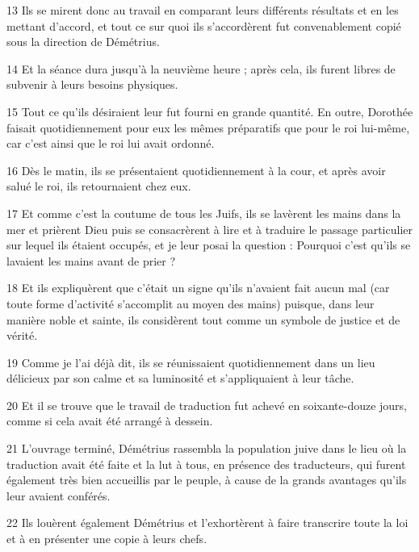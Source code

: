 \par 13 Ils se mirent donc au travail en comparant leurs différents résultats et en les mettant d'accord, et tout ce sur quoi ils s'accordèrent fut convenablement copié sous la direction de Démétrius.

\par 14 Et la séance dura jusqu'à la neuvième heure ; après cela, ils furent libres de subvenir à leurs besoins physiques.

\par 15 Tout ce qu'ils désiraient leur fut fourni en grande quantité. En outre, Dorothée faisait quotidiennement pour eux les mêmes préparatifs que pour le roi lui-même, car c'est ainsi que le roi lui avait ordonné.

\par 16 Dès le matin, ils se présentaient quotidiennement à la cour, et après avoir salué le roi, ils retournaient chez eux.

\par 17 Et comme c'est la coutume de tous les Juifs, ils se lavèrent les mains dans la mer et prièrent Dieu puis se consacrèrent à lire et à traduire le passage particulier sur lequel ils étaient occupés, et je leur posai la question : Pourquoi c'est qu'ils se lavaient les mains avant de prier ?

\par 18 Et ils expliquèrent que c'était un signe qu'ils n'avaient fait aucun mal (car toute forme d'activité s'accomplit au moyen des mains) puisque, dans leur manière noble et sainte, ils considèrent tout comme un symbole de justice et de vérité.

\par 19 Comme je l'ai déjà dit, ils se réunissaient quotidiennement dans un lieu délicieux par son calme et sa luminosité et s'appliquaient à leur tâche.

\par 20 Et il se trouve que le travail de traduction fut achevé en soixante-douze jours, comme si cela avait été arrangé à dessein.

\par 21 L'ouvrage terminé, Démétrius rassembla la population juive dans le lieu où la traduction avait été faite et la lut à tous, en présence des traducteurs, qui furent également très bien accueillis par le peuple, à cause de la grands avantages qu'ils leur avaient conférés.

\par 22 Ils louèrent également Démétrius et l'exhortèrent à faire transcrire toute la loi et à en présenter une copie à leurs chefs.

